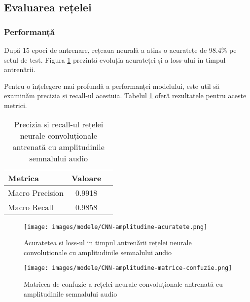\subsection{Evaluarea rețelei}

\subsubsection{Performanță}

După 15 epoci de antrenare, rețeaua neurală a atins o acuratețe de 98.4\% pe setul de test. Figura \ref{fig:acuratete_CNN_amplitude}
 prezintă evoluția acurateței și a loss-ului în timpul antrenării.

Pentru o înțelegere mai profundă a performanței modelului, este util să examinăm precizia și recall-ul acestuia. Tabelul \ref{tab:precizie_recall_CNN_amplitude} oferă rezultatele pentru aceste metrici.

\begin{table}[h]
    \centering
    \begin{tabular}{lcc}
        \toprule
        \textbf{Metrica} & \textbf{Valoare} \\
        \midrule
        Macro Precision & 0.9918 \\
        Macro Recall    & 0.9858 \\
        \bottomrule
    \end{tabular}
    \caption{Precizia si recall-ul rețelei neurale convoluționale antrenată cu amplitudinile semnalului audio}
    \label{tab:precizie_recall_CNN_amplitude}
\end{table}

\begin{figure}
    \centering
    \texttt{[image: images/modele/CNN-amplitudine-acuratete.png]}
    \caption{Acuratețea si loss-ul in timpul antrenării rețelei neurale convoluționale cu amplitudinile semnalului audio}
    \label{fig:acuratete_CNN_amplitude}
\end{figure}

\begin{figure}
    \centering
    \texttt{[image: images/modele/CNN-amplitudine-matrice-confuzie.png]}
    \caption{Matricea de confuzie a rețelei neurale convoluționale antrenată cu amplitudinile semnalului audio}
    \label{fig:matriceConfuzie_CNN_amplitude}
\end{figure}

